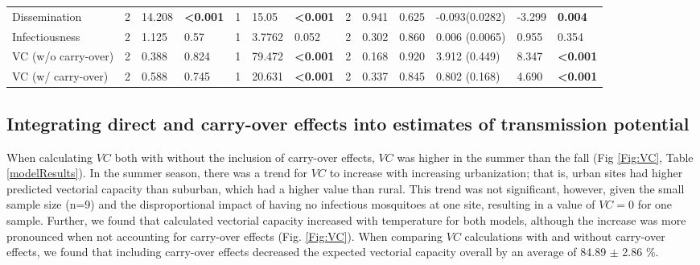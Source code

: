\documentclass[12pt]{article}
\begin{document}
\begin{table}[]
\begin{tabular}{lllllllllllll}
Dissemination               & 2           & 14.208    & \textbf{\textless0.001} & 1           & 15.05     & \textbf{\textless0.001} & 2           & 0.941     & 0.625                   & -0.093(0.0282)   & -3.299  & \textbf{0.004}          \\
Infectiousness              & 2           & 1.125     & 0.57                    & 1           & 3.7762    & 0.052                   & 2           & 0.302     & 0.860                   & 0.006 (0.0065)   & 0.955   & 0.354                   \\
VC (w/o carry-over)         & 2           & 0.388     & 0.824                   & 1           & 79.472    & \textbf{\textless0.001} & 2           & 0.168     & 0.920                   & 3.912 (0.449)    & 8.347   & \textbf{\textless0.001} \\
VC (w/ carry-over)          & 2           & 0.588     & 0.745                   & 1           & 20.631    & \textbf{\textless0.001} & 2           & 0.337     & 0.845                   & 0.802 (0.168)    & 4.690   & \textbf{\textless0.001} \\
\end{tabular}
\end{table}

\subsection{Integrating direct and carry-over effects into estimates of transmission potential}

When calculating $VC$ both with without the inclusion of carry-over effects, $VC$ was higher in the summer than the fall (Fig \ref{Fig:VC}, Table \ref{modelResults}). In the summer season, there was a trend for $VC$ to increase with increasing urbanization; that is, urban sites had higher predicted vectorial capacity than suburban, which had a higher value than rural. This trend was not significant, however, given the small sample size (n=9) and the disproportional impact of having no infectious mosquitoes at one site, resulting in a value of $VC=0$ for one sample. Further, we found that calculated vectorial capacity increased with temperature for both models, although the increase was more pronounced when not accounting for carry-over effects (Fig. \ref{Fig:VC}). When comparing $VC$ calculations with and without carry-over effects, we found that including carry-over effects decreased the expected vectorial capacity overall by an average of 84.89 $\pm$ 2.86 \%.
\end{document}
